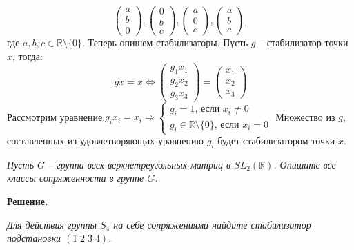 \documentclass[a4paper, 12pt]{article}
\newcommand{\R}{\mathbb{R}}
\newcommand{\x}{\times}
\begin{document}
\begin{spacing}{1}
$$\begin{pmatrix}
a\\b\\0
\end{pmatrix},
\begin{pmatrix}
0\\b\\c
\end{pmatrix},
\begin{pmatrix}
a\\0\\c
\end{pmatrix},
\begin{pmatrix}
a\\b\\c
\end{pmatrix},
$$ где $a,b,c \in \R\setminus\{0\}.$ Теперь опишем стабилизаторы. Пусть $g$ -- стабилизатор точки $x$, тогда:
$$gx=x\Leftrightarrow \begin{pmatrix}
g_1x_1\\g_2x_2\\g_3x_3
\end{pmatrix} = \begin{pmatrix}
x_1\\x_2\\x_3
\end{pmatrix}$$
Рассмотрим уравнение:$g_ix_i=x_i \Rightarrow \begin{cases}
g_i = 1\text{, если } x_i \neq 0\\
g_i \in \R\setminus\{0\}\text{, если }x_i = 0
\end{cases}$ Множество из $g$, составленных из удовлетворяющих уравнению $g_i$ будет стабилизатором точки $x$.
\newpage
\begin{center}
\end{center}

\noindent \textit{Пусть $G$ -- группа всех верхнетреугольных матриц в $SL_2(\R)$. Опишите все классы сопряженности в группе $G$.}

\noindent \textbf{Решение.}









\newpage
\begin{center}
\end{center}

\noindent \textit{Для действия группы $S_4$ на себе сопряжениями найдите стабилизатор подстановки $(1\;2\;3\;4)$.}


\end{spacing}
\end{document}
